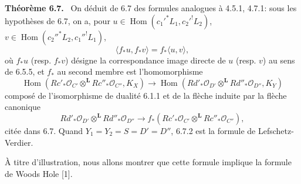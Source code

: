 \documentclass[11pt]{article}
\newenvironment{statement}[1]{\par\medskip\noindent\textbf{#1.}\ }{\par\medskip}
\DeclareMathOperator{\Hom}{Hom}
\providecommand{\LL}{\mathbf L}
\providecommand{\OO}{\mathcal O}
\begin{document}
\begin{statement}{Théorème 6.7}
On déduit de 6.7 des formules analogues à 4.5.1, 4.7.1: sous les hypothèses de 6.7, on a, pour $u\in\Hom(c_1'^*L_1,c_2'^!L_2)$, $v\in\Hom(c_2''^*L_2,c_1''^!L_1)$,
\begin{equation}
\tag{6.7.2}
\langle f_*u,f_*v\rangle=f_*\langle u,v\rangle,
\end{equation}
où $f_*u$ (resp. $f_*v$) désigne la correspondance image directe de $u$ (resp. $v$) au sens de 6.5.5, et $f_*$ au second membre est l'homomorphisme
\begin{equation}
\tag{6.7.3}
\Hom(Rc'_*\OO_{C'}\otimes^{\LL}Rc''_*\OO_{C''},K_X)
\longrightarrow
\Hom(Rd'_*\OO_{D'}\otimes^{\LL}Rd''_*\OO_{D''},K_Y)
\end{equation}
composé de l'isomorphisme de dualité 6.1.1 et de la flèche induite par la flèche canonique
\[
Rd'_*\OO_{D'}\otimes^{\LL}Rd''_*\OO_{D''}
\longrightarrow
f_*(Rc'_*\OO_{C'}\otimes^{\LL}Rc''_*\OO_{C''}),
\]
citée dans 6.7. Quand $Y_1=Y_2=S=D'=D''$, 6.7.2 est la formule de Lefschetz-Verdier.

À titre d'illustration, nous allons montrer que cette formule implique la formule de Woods Hole [1].
\end{statement}
\end{document}
